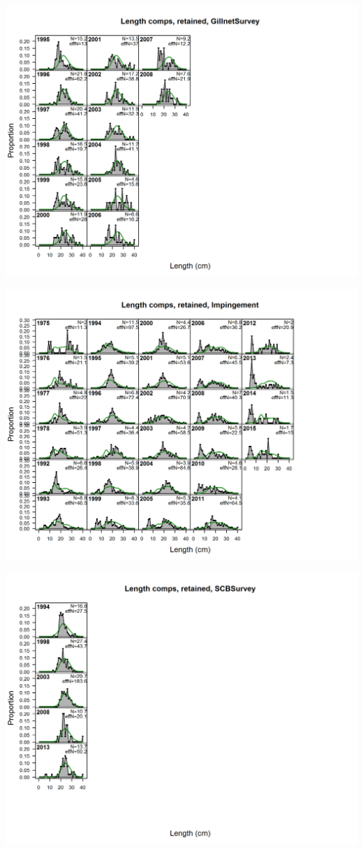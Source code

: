 \documentclass[ignorenonframetext,compress]{beamer}
\begin{document}
\includegraphics{./r4ss/plots_mod1/comp_lenfit_flt9mkt2.png}

\includegraphics{./r4ss/plots_mod1/comp_lenfit_flt10mkt2.png}

\includegraphics{./r4ss/plots_mod1/comp_lenfit_flt11mkt2.png}
\end{document}
